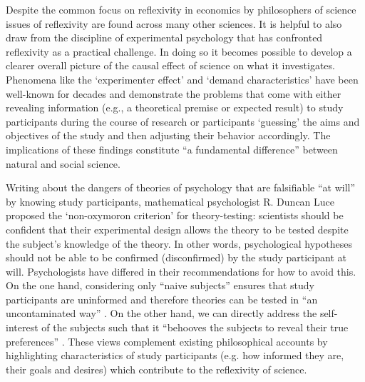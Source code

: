 
Despite the common focus on reflexivity in economics by philosophers of science issues of reflexivity are found across many other sciences. It is helpful to also draw from the discipline of experimental psychology that has confronted reflexivity as a practical challenge. In doing so it becomes possible to develop a clearer overall picture of the causal effect of science on what it investigates. Phenomena like the `experimenter effect' \autocite{rosenthal1966} and `demand characteristics' \autocite{orne1962} have been well-known for decades and demonstrate the problems that come with either revealing information (e.g., a theoretical premise or expected result) to study participants during the course of research or participants `guessing' the aims and objectives of the study and then adjusting their behavior accordingly. The implications of these findings constitute ``a fundamental difference'' \autocite[p313]{gergen1973} between natural and social science.

Writing about the dangers of theories of psychology that are falsifiable ``at will'' by knowing study participants, mathematical psychologist R. Duncan Luce proposed the `non-oxymoron criterion' \autocite[p3]{luce95} for theory-testing: scientists should be confident that their experimental design allows the theory to be tested despite the subject's knowledge of the theory. In other words, psychological hypotheses should not be able to be confirmed (disconfirmed) by the study participant at will. Psychologists have differed in their recommendations for how to avoid this. On the one hand, considering only ``naive subjects'' ensures that study participants are uninformed and therefore theories can be tested in ``an uncontaminated way'' \autocite[p313]{gergen1973}. On the other hand, we can directly address the self-interest of the subjects such that it ``behooves the subjects to reveal their true preferences'' \autocite[p9]{luce95}. These views complement existing philosophical accounts by highlighting characteristics of study participants (e.g. how informed they are, their goals and desires) which contribute to the reflexivity of science.

